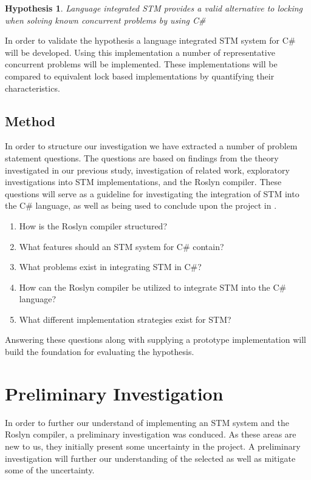 \newtheorem{hypo}{Hypothesis}
\begin{hypo}
Language integrated \ac{STM} provides a valid alternative to locking when solving known concurrent problems by using C\#
\end{hypo}

In order to validate the hypothesis a language integrated \ac{STM} system for C\# will be developed. Using this implementation a number of representative concurrent problems will be implemented. These implementations will be compared to equivalent lock based implementations by quantifying their characteristics.%

\subsection{Method}
In order to structure our investigation we have extracted a number of problem statement questions. The questions are based on findings from the theory investigated in our previous study, investigation of related work, exploratory investigations into \ac{STM} implementations, and the Roslyn compiler. These questions will serve as a guideline for investigating the integration of \ac{STM} into the C\# language, as well as being used to conclude upon the project in .

\begin{enumerate}
\item How is the Roslyn compiler structured?
\item What features should an \ac{STM} system for C\# contain?
\item What problems exist in integrating \ac{STM} in C\#?
\item How can the Roslyn compiler be utilized to integrate \ac{STM} into the C\# language?
\item What different implementation strategies exist for \ac{STM}?
\end{enumerate}

Answering these questions along with supplying a prototype implementation will build the foundation for evaluating the hypothesis.
 
\section{Preliminary Investigation}
In order to further our understand of implementing an \ac{STM} system and the Roslyn compiler, a preliminary investigation was conduced. As these areas are new to us, they initially present some uncertainty in the project. A preliminary investigation will further our understanding of the selected as well as mitigate some of the uncertainty.

